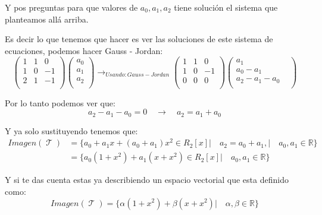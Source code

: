 \documentclass[12pt]{report}                                    %
\DeclareMathOperator \LinealTransformation {\mathcal{T}}        %
\begin{document}
            Y pos preguntas para que valores de $a_0, a_1, a_2$ tiene solución el 
            sistema que planteamos allá arriba.

            Es decir lo que tenemos que hacer es ver las soluciones de
            este sistema de ecuaciones, podemos hacer Gauss - Jordan:
            \begin{equation*}
                \begin{pmatrix} 1&1&0 \\ 1&0&-1 \\ 2&1&-1 \\\end{pmatrix} 
                \begin{pmatrix} a_0 \\ a_1 \\ a_2 \\\end{pmatrix}
                \to_{Usando: Gauss-Jordan}
                \begin{pmatrix} 1&1&0 \\ 1&0&-1 \\ 0&0&0 \\\end{pmatrix}
                \begin{pmatrix} a_1 & \\ a_0-a_1 &\\ a_2-a_1-a_0 &\\\end{pmatrix}
            \end{equation*}

            Por lo tanto podemos ver que:
            \begin{equation*}
                a_2-a_1-a_0 = 0
                \quad \to \quad
                a_2 = a_1 + a_0
            \end{equation*}

            Y ya solo sustituyendo tenemos que:
            \begin{equation*}
            \begin{split}
                Imagen(\LinealTransformation) 
                & = \{a_0+a_1x+(a_0+a_1)x^2 \in R_2[x] |\quad a_2 = a_0 + a_1, |\quad a_0, a_1 \in \mathbb{R}\}  \\
                & = \{a_0(1+x^2) +a_1(x+x^2) \in R_2[x] |\quad a_0, a_1 \in \mathbb{R}\}
            \end{split}
            \end{equation*}

            Y si te das cuenta estas ya describiendo un espacio vectorial que esta definido como:
            \begin{equation*}
                Imagen(\LinealTransformation) = \{\alpha(1+x^2) + \beta(x+x^2) |\quad \alpha, \beta \in \mathbb{R}\}
            \end{equation*}
\end{document}
